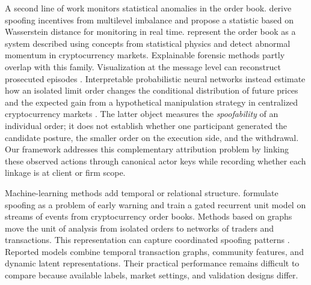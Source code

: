 \documentclass[11pt]{article}
\newenvironment{review}{\begingroup\color{blue}}{\endgroup}
\begin{document}
A second line of work monitors statistical anomalies in the order book. \cite{TaoDayLingDrapeau2022} derive spoofing
incentives from multilevel imbalance and propose \begin{review}a statistic based on Wasserstein distance for monitoring in real time\end{review}.
\cite{LiPolukarovaVentre2023} represent the order book as \begin{review}a system described using concepts from statistical physics\end{review} and detect abnormal momentum in
cryptocurrency markets. Explainable forensic methods partly overlap with this family. \begin{review}Visualization at the message level\end{review} can
reconstruct prosecuted episodes \cite{DebieEtAl2023}. Interpretable probabilistic neural networks instead estimate how an
isolated limit order changes the conditional distribution of future prices and the expected gain from a hypothetical
manipulation strategy in centralized cryptocurrency markets \cite{FabreChallet2025}. The latter object measures
\begin{review}the \emph{spoofability} of an individual order\end{review}; it does not establish whether one participant generated the candidate posture, \begin{review}the smaller order on the execution side\end{review}, and the withdrawal. Our framework addresses this complementary attribution problem by
linking these observed actions through canonical actor keys while recording whether each linkage is at client or firm scope.

Machine-learning methods add temporal or relational structure. \cite{TuccellaNadlerSerban2021} formulate spoofing as \begin{review}a problem of early warning\end{review} and train a gated recurrent unit model on \begin{review}streams of events from cryptocurrency order books\end{review}. \begin{review}Methods based on graphs\end{review} move the unit of analysis from isolated orders to networks of traders and transactions. This representation can
capture coordinated spoofing patterns \cite{KangMuNing2023,KangMuNing2024,XiangEtAl2025}. Reported models combine
temporal transaction graphs, community features, and dynamic latent representations. Their practical performance remains
difficult to compare because available labels, market settings, and validation designs differ.
\end{document}
